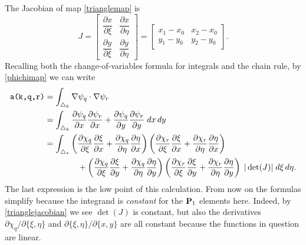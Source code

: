 The Jacobian of map \eqref{trianglemap} is
\begin{equation}
J = \begin{bmatrix}
    \dfrac{\partial x}{\partial \xi} & \dfrac{\partial x}{\partial \eta} \\[1.0em]
    \dfrac{\partial y}{\partial \xi} & \dfrac{\partial y}{\partial \eta}
    \end{bmatrix}
    =
    \begin{bmatrix}
    x_1-x_0 & x_2-x_0 \\
    y_1-y_0 & y_2-y_0
    \end{bmatrix}.  \label{trianglejacobian}
\end{equation}
Recalling both the change-of-variables formula for integrals and the chain rule, by \eqref{phichimap} we can write
\begin{align}
\text{\texttt{a(k,q,r)}} &= \int_{\triangle_k} \nabla\psi_q \cdot \nabla\psi_r \label{elementcontrib} \\
   &= \int_{\triangle_k} \frac{\partial\psi_q}{\partial x} \frac{\partial\psi_r}{\partial x} + \frac{\partial\psi_q}{\partial y} \frac{\partial\psi_r}{\partial y} \; dx \, dy  \notag \\
   &= \int_{\triangle_\ast} \left(\frac{\partial \chi_q}{\partial \xi} \frac{\partial \xi}{\partial x} + \frac{\partial \chi_q}{\partial \eta} \frac{\partial \eta}{\partial x}\right) \left(\frac{\partial \chi_r}{\partial \xi} \frac{\partial \xi}{\partial x} + \frac{\partial \chi_r}{\partial \eta} \frac{\partial \eta}{\partial x}\right) \notag \\
   &\qquad\qquad + \left(\frac{\partial \chi_q}{\partial \xi} \frac{\partial \xi}{\partial y} + \frac{\partial \chi_q}{\partial \eta} \frac{\partial \eta}{\partial y}\right) \left(\frac{\partial \chi_r}{\partial \xi} \frac{\partial \xi}{\partial y} + \frac{\partial \chi_r}{\partial \eta} \frac{\partial \eta}{\partial y}\right) \; |\det(J)| \; d\xi \, d\eta. \notag
\end{align}
The last expression is the low point of this calculation.  From now on the formulas simplify because the integrand is \emph{constant} for the $\mathbf{P}_1$ elements here.  Indeed, by \eqref{trianglejacobian} we see $\det(J)$ is constant, but also the derivatives $\partial \chi_q/\partial\{\xi,\eta\}$ and $\partial\{\xi,\eta\}/\partial\{x,y\}$ are all constant because the functions in question are linear.

